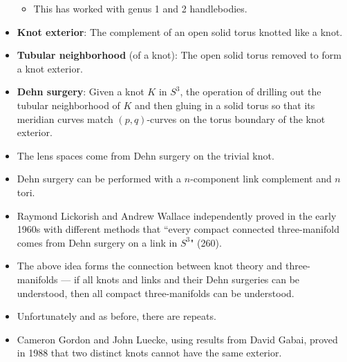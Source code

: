 \documentclass[titlepage]{article}
\numberwithin{figure}{section}
\numberwithin{table}{section}
\numberwithin{equation}{section}
\newcommand{\dq}[2]{``#1" (#2).}
\begin{document}
\begin{itemize}
    \begin{itemize}
        \item This has worked with genus 1 and 2 handlebodies.
    \end{itemize}
    \item \textbf{Knot exterior}: The complement of an open solid torus knotted like a knot.
    \item \textbf{Tubular neighborhood} (of a knot): The open solid torus removed to form a knot exterior.
    \item \textbf{Dehn surgery}: Given a knot $K$ in $S^3$, the operation of drilling out the tubular neighborhood of $K$ and then gluing in a solid torus so that its meridian curves match $(p,q)$-curves on the torus boundary of the knot exterior.
    \item The lens spaces come from Dehn surgery on the trivial knot.
    \item Dehn surgery can be performed with a $n$-component link complement and $n$ tori. 
    \item Raymond Lickorish and Andrew Wallace independently proved in the early 1960s with different methods that \dq{every compact connected three-manifold comes from Dehn surgery on a link in $S^3$}{260}
    \item The above idea forms the connection between knot theory and three-manifolds --- if all knots and links and their Dehn surgeries can be understood, then all compact three-manifolds can be understood.
    \item Unfortunately and as before, there are repeats.
    \item Cameron Gordon and John Luecke, using results from David Gabai, proved in 1988 that two distinct knots cannot have the same exterior.
    \begin{figure}[h!]
        \centering
\end{figure}
\end{itemize}
\end{document}
